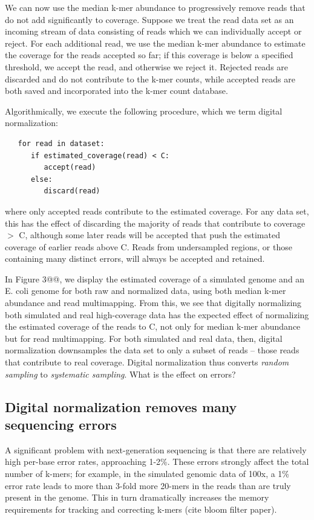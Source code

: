 \documentclass[10pt]{article}
\begin{document}
We can now use the median k-mer abundance to progressively remove
reads that do not add significantly to coverage.  Suppose we treat the
read data set as an incoming stream of data consisting of reads which
we can individually accept or reject.  For each additional read, we
use the median k-mer abundance to estimate the coverage for the reads
accepted so far; if this coverage is below a specified threshold, we
accept the read, and otherwise we reject it.  Rejected reads are
discarded and do not contribute to the k-mer counts, while accepted
reads are both saved and incorporated into the k-mer count database.

Algorithmically, we execute the following procedure, which we term
digital normalization:

\begin{verbatim}
   for read in dataset:
      if estimated_coverage(read) < C:
         accept(read)
      else:
         discard(read)
\end{verbatim}

where only accepted reads contribute to the estimated coverage.  For any
data set, this has the effect of discarding the majority of reads that
contribute to coverage $>$ C, although some later reads will be accepted
that push the estimated coverage of earlier reads above C.  Reads from
undersampled regions, or those containing many distinct errors, will always
be accepted and retained.

In Figure 3@@, we display the estimated coverage of a simulated genome
and an E. coli genome for both raw and normalized data, using both
median k-mer abundance and read multimapping.  From this, we see that
digitally normalizing both simulated and real high-coverage data has
the expected effect of normalizing the estimated coverage of the reads
to C, not only for median k-mer abundance but for read multimapping.
For both simulated and real data, then, digital normalization
downsamples the data set to only a subset of reads -- those reads that
contribute to real coverage.  Digital normalization thus converts {\em
random sampling} to {\em systematic sampling}.  What is the effect on
errors?

\subsection*{Digital normalization removes many sequencing errors}

A significant problem with next-generation sequencing is that there
are relatively high per-base error rates, approaching 1-2\%.  These
errors strongly affect the total number of k-mers; for example, in the
simulated genomic data of 100x, a 1\% error rate leads to more than
3-fold more 20-mers in the reads than are truly present in the genome.
This in turn dramatically increases the memory requirements for
tracking and correcting k-mers (cite bloom filter paper).
\end{document}
